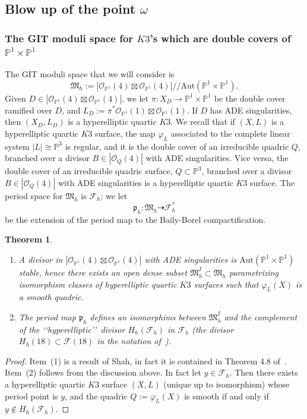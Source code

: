 \documentclass[11pt]{amsart}
\numberwithin{equation}{section}
\theoremstyle{plain}
\newtheorem{theorem}{Theorem}[section]
\theoremstyle{remark}
\theoremstyle{definition}
\newcommand{\cF}{\mathscr{F}}
\newcommand{\gp}{\mathfrak{p}}
\newcommand{\Aut}{\mathrm{Aut}}
\newcommand{\gquot}{/\!\!/}
\newcommand{\cO}{{\mathscr O}}
\newcommand{\dra}{\dashrightarrow}
\newcommand{\gM}{\mathfrak{M}}
\newcommand{\PP}{{\mathbb P}}
\begin{document}
%
\subsection{Blow up of the point $\omega$}\label{subsec:sblowomega}
%
\subsubsection{The GIT moduli space  for $K3$'s which are double covers of $\PP^1\times\PP^1$}
%
The   GIT moduli space that we will consider is 
%
\begin{equation}\label{hypermoduli}
%
\gM_h:=|\cO_{\PP^1}(4)\boxtimes \cO_{\PP^1}(4)|\gquot \Aut(\PP^1\times\PP^1).
%
\end{equation}
%
 Given $D\in|\cO_{\PP^1}(4)\boxtimes \cO_{\PP^1}(4)|$, we let $\pi\colon X_D\to\PP^1\times\PP^1$ be the double cover ramified over $D$, and  $L_D:=\pi^{*}\cO_{\PP^1}(1)\boxtimes \cO_{\PP^1}(1)$. If $D$ has ADE singularities, then $(X_D,L_D)$ is a hyperelliptic quartic $K3$.  We recall that if  $(X,L)$ is a hyperelliptic quartic $K3$ surface,  the map $\varphi_L$  associated to the complete linear system $ |L|\cong\PP^3$ is  regular, and it is the double cover of an irreducible quadric ${Q}$, branched over a divisor $B\in |\cO_{Q}(4)|$  with ADE singularities. Vice versa, the double cover of an irreducible quadric surface, ${Q}\subset\PP^3$, branched over a divisor $B\in |\cO_{Q}(4)|$  with ADE singularities is  a hyperelliptic quartic $K3$ surface. The period space for $\gM_h$ is $\cF_h$; we let 
%
\begin{equation}\label{perhyp}
%
\gp_h\colon \gM_h\dra \cF_h^{*}
%
\end{equation}
%
 be the extension of the period map to the Baily-Borel compactification. 
% 
\begin{theorem}\label{thm:secondblowup}
%
%
\begin{enumerate}
%
\item
%
A divisor in $|\cO_{\PP^1}(4)\boxtimes \cO_{\PP^1}(4)|$ with ADE singularities is $\Aut(\PP^1\times\PP^1)$ stable, hence there exists an open dense subset   $\gM^I_h\subset\gM_h$  parametrizing  isomorphism classes of  hyperelliptic quartic $K3$ surfaces such that $\varphi_L(X)$ is a smooth quadric. 
%
\item
%
The period map $\gp_h$ defines an isomorphims between $\gM^I_h$ and the complement of the \lq\lq hyperelliptic\rq\rq\ divisor $H_h(\cF_h)$ in $\cF_h$ (the divisor $H_h(18)\subset\cF(18)$ in the notation of~\cite{log1}).
% 
\end{enumerate}
%
\end{theorem}
%
\begin{proof}
%
Item~(1) is a result of Shah, in fact it is contained in Theorem 4.8 of~\cite{shah4}. Item~(2) follows from the discussion above. In fact let $y\in\cF_h$. Then there exists  a hyperelliptic quartic $K3$ surface $(X,L)$ (unique up to isomorphism) whose period point is $y$, and the quadric ${Q}:=\varphi_L(X)$ is smooth if and only if $y\notin H_h(\cF_h)$.  
%
\end{proof}
%
%
\end{document}
